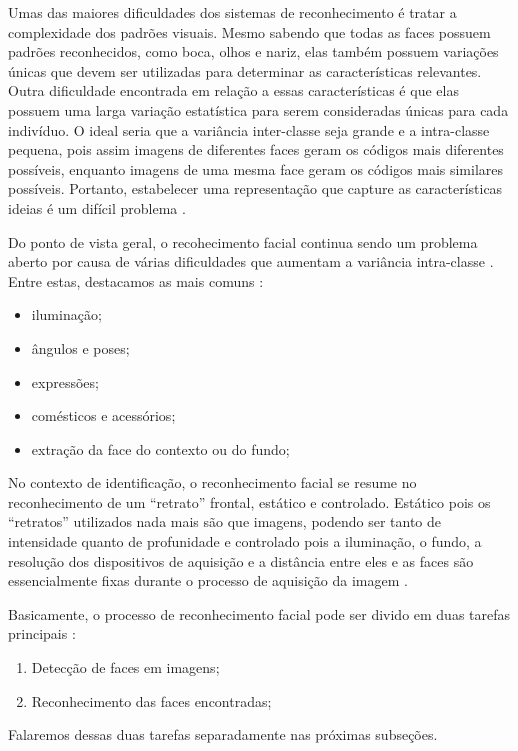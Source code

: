 Umas das maiores dificuldades dos sistemas de reconhecimento é tratar a complexidade dos padrões visuais. Mesmo sabendo que todas as faces possuem padrões reconhecidos, como boca, olhos e nariz, elas também possuem variações únicas que devem ser utilizadas para determinar as características relevantes. Outra dificuldade encontrada em relação a essas características é que elas possuem uma larga variação estatística para serem consideradas únicas para cada indivíduo. O ideal seria que a variância inter-classe seja grande e a intra-classe pequena, pois assim imagens de diferentes faces geram os códigos mais diferentes possíveis, enquanto imagens de uma mesma face geram os códigos mais similares possíveis. Portanto, estabelecer uma representação que capture as características ideias é um difícil problema \cite{saocarlos}.

Do ponto de vista geral, o recohecimento facial continua sendo um problema aberto por causa de várias dificuldades que aumentam a variância intra-classe \cite{hong}. Entre estas, destacamos as mais comuns \cite{saocarlos}:

	\begin{itemize}
		\item iluminação;
		\item ângulos e poses;
		\item expressões;
		\item comésticos e acessórios;
		\item extração da face do contexto ou do fundo;
	\end{itemize}

No contexto de identificação, o reconhecimento facial se resume no reconhecimento de um ``retrato'' frontal, estático e controlado. Estático pois os ``retratos'' utilizados nada mais são que imagens, podendo ser tanto de intensidade quanto de profunidade e controlado pois a iluminação, o fundo, a resolução dos dispositivos de aquisição e a distância entre eles e as faces são essencialmente fixas durante o processo de aquisição da imagem \cite{hong}.

Basicamente, o processo de reconhecimento facial pode ser divido em duas tarefas principais \cite{hong}:

	\begin{enumerate}
		\item Detecção de faces em imagens;
		\item Reconhecimento das faces encontradas;
	\end{enumerate}

Falaremos dessas duas tarefas separadamente nas próximas subseções.




